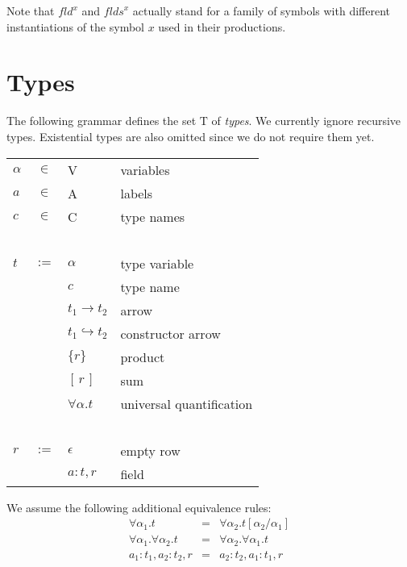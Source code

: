 \documentclass[twoside]{article}
\newcommand{\conarrow}{\hookrightarrow}
\newcommand{\x}[1]{\mathit{#1}}
\newcommand{\f}[1]{\mbox{#1}}
\newcommand{\fld}{\x{fld}}
\newcommand{\flds}{\x{flds}}
\begin{document}
Note that $\fld^x$ and $\flds^x$ actually stand for a family of symbols with different instantiations of the symbol $x$ used in their productions.


\section{Types}
\label{types}

The following grammar defines the set $\f{T}$ of {\em types}. We currently ignore recursive types. Existential types are also omitted since we do not require them yet.

\begin{center}
\begin{tabular}{lcll}
$\alpha$&$\in$&	\f{V}				& variables \\
$a$	&$\in$&	\f{A}				& labels \\
$c$	&$\in$&	\f{C}				& type names \\
\ \\

$t$	&$:=$&	$\alpha$			& type variable \\
	&&	$c$				& type name \\
	&&	$t_1 \to t_2$			& arrow \\
	&&	$t_1 \conarrow t_2$		& constructor arrow \\
	&&	$\{r\}$				& product \\
	&&	$[\,r\,]$			& sum \\
	&&	$\forall \alpha . t$		& universal quantification \\
\ \\

$r$	&$:=$&	$\epsilon$			& empty row \\
	&&	$a:t,r$				& field \\
%
\end{tabular}
\end{center}

We assume the following additional equivalence rules:
\begin{eqnarray*}
\forall \alpha_1.t &=& \forall \alpha_2.t[\alpha_2/\alpha_1] \\
\forall \alpha_1.\forall \alpha_2.t &=& \forall \alpha_2.\forall \alpha_1.t \\
a_1:t_1,a_2:t_2,r &=& a_2:t_2,a_1:t_1,r
\end{eqnarray*}
\end{document}
